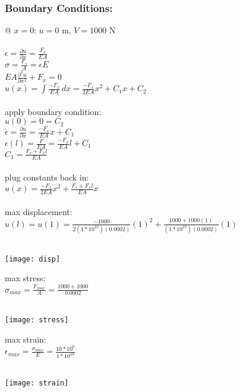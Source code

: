 \documentclass{article}
\begin{document}
\subsubsection*{Boundary Conditions:}
@ $x=0$: $u=0$ m, $V=1000$ N \\\\
$\epsilon = \frac{\partial u}{\partial x} = \frac{F_s}{EA}$ \\
$\sigma = \frac{F_s}{A} = \epsilon E$ \\
$EA\frac{\partial^2 u}{\partial x^2} + F_x = 0$ \\
$u(x) = \int{\frac{-F_x}{EA}}\,dx = \frac{-F_x}{2EA}x^2 + C_1x
+ C_2$ \\\\
apply boundary condition: \\
$u(0) = 0 = C_2$ \\
$\epsilon = \frac{\partial u}{\partial x} = \frac{-F_x}{EA}x +
C_1$ \\
$\epsilon(l) = \frac{F}{EA} = \frac{-F_x}{EA}l + C_1$\\
$C_1 = \frac{F_s + F_xl}{EA}$ \\\\
plug constants back in: \\
$u(x) = \frac{-F_x}{2EA}x^2 + \frac{F_s + F_xl}{EA}x$\\\\
max displacement: \\
$u(l) = u(1) = \frac{-1000}{2(1*10^{10})(0.0002)}(1)^2 +
\frac{1000 + 1000(1)}{(1*10^{10})(0.0002)}(1) $\\
 \\
\begin{center}
    \texttt{[image: disp]}  
\end{center}
max stress: \\
$\sigma_{max} = \frac{F_{max}}{A} = \frac{1000 + 1000}{0.0002}$\\
 \\
\begin{center}
    \texttt{[image: stress]}  
\end{center}
max strain: \\
$\epsilon_{max} = \frac{\sigma_{max}}{E} = \frac{10*10^6}{1*10^{10}} $\\
 \\
\begin{center}
    \texttt{[image: strain]}  
\end{center}
\end{document}
